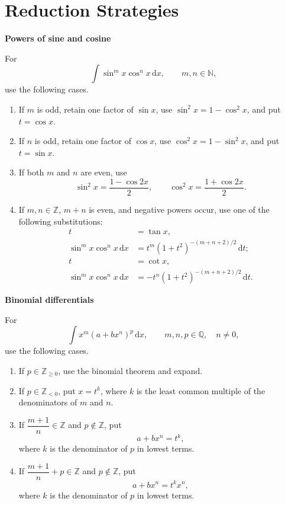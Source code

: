 \documentclass[11pt,a4paper,fleqn]{article}
\newcommand{\dd}{\,\mathrm{d}}
\newenvironment{strategybox}[1]
  {\par{\bfseries #1}\par\smallskip\small}
  {\par}
\begin{document}
\section*{Reduction Strategies}

\noindent
\begin{minipage}[t]{0.49\textwidth}
\begin{strategybox}{Powers of sine and cosine}
For
\[
\int\sin^m x\cos^n x\dd x,
\qquad m,n\in\mathbb N,
\]
use the following cases.
\begin{enumerate}[leftmargin=1.8em,itemsep=0.25em,topsep=0.3em]
\item If \(m\) is odd, retain one factor of \(\sin x\), use
      \(\sin^2x=1-\cos^2x\), and put \(t=\cos x\).
\item If \(n\) is odd, retain one factor of \(\cos x\), use
      \(\cos^2x=1-\sin^2x\), and put \(t=\sin x\).
\item If both \(m\) and \(n\) are even, use
      \[
      \sin^2x=\frac{1-\cos 2x}{2},\qquad
      \cos^2x=\frac{1+\cos 2x}{2}.
      \]
\item If \(m,n\in\mathbb Z\), \(m+n\) is even, and negative powers occur,
      use one of the following substitutions:
      \[
      \begin{aligned}
      t&=\tan x,\\[-0.1em]
      \sin^m x\cos^n x\dd x
      &=t^m(1+t^2)^{-(m+n+2)/2}\dd t;\\[0.35em]
      t&=\cot x,\\[-0.1em]
      \sin^m x\cos^n x\dd x
      &=-t^n(1+t^2)^{-(m+n+2)/2}\dd t.
      \end{aligned}
      \]
\end{enumerate}
\end{strategybox}
\end{minipage}
\hfill
\begin{minipage}[t]{0.49\textwidth}
\begin{strategybox}{Binomial differentials}
For
\[
\int x^m(a+bx^n)^p\dd x,
\qquad m,n,p\in\mathbb Q,
\quad n\ne0,
\]
use the following cases.
\begin{enumerate}[leftmargin=1.8em,itemsep=0.25em,topsep=0.3em]
\item If \(p\in\mathbb Z_{\ge0}\), use the binomial theorem and expand.
\item If \(p\in\mathbb Z_{<0}\), put \(x=t^k\), where \(k\) is the least
      common multiple of the denominators of \(m\) and \(n\).
\item If \(\dfrac{m+1}{n}\in\mathbb Z\) and \(p\notin\mathbb Z\), put
      \[
      a+bx^n=t^k,
      \]
      where \(k\) is the denominator of \(p\) in lowest terms.
\item If \(\dfrac{m+1}{n}+p\in\mathbb Z\) and \(p\notin\mathbb Z\), put
      \[
      a+bx^n=t^k x^n,
      \]
      where \(k\) is the denominator of \(p\) in lowest terms.
\end{enumerate}
\end{strategybox}
\end{minipage}
\end{document}
